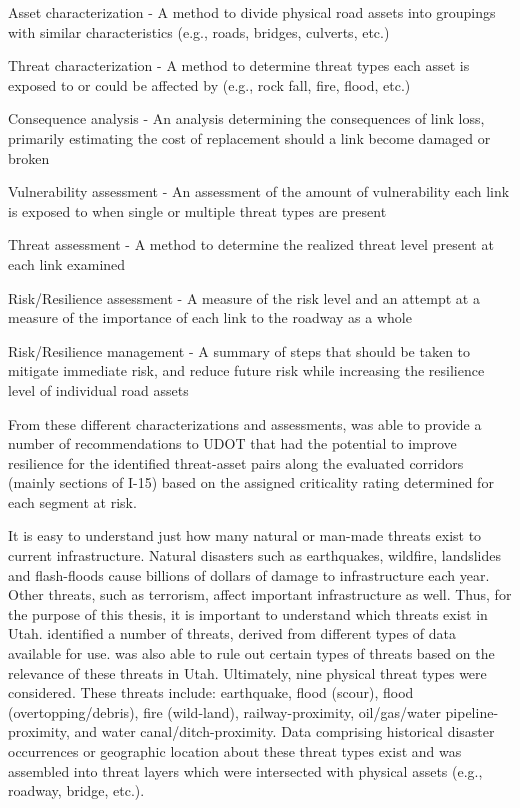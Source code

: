 \begin{description}
	\item Asset characterization - A method to divide physical road assets into
	groupings with similar characteristics (e.g., roads, bridges, culverts, etc.)
	\item Threat characterization - A method to determine threat types each asset
	is exposed to or could be affected by (e.g., rock fall, fire, flood, etc.)
	\item Consequence analysis - An analysis determining the consequences of link
	loss, primarily estimating the cost of replacement should a link become
	damaged or broken
	\item Vulnerability assessment - An assessment of the amount of vulnerability
	each link is exposed to when single or multiple threat types are present
	\item Threat assessment - A method to determine the realized threat level
	present at each link examined
	\item Risk/Resilience assessment - A measure of the risk level and an attempt
	at a measure of the importance of each link to the roadway as a whole
	\item Risk/Resilience management - A summary of steps that should be taken to
	mitigate immediate risk, and reduce future risk while increasing the
	resilience level of individual road assets
\end{description}

From these different characterizations and assessments,
\citet{aem2017} was able to provide a number of recommendations to UDOT that had the
potential to improve
resilience for the identified threat-asset pairs along the evaluated corridors (mainly sections of I-15)
based on the assigned criticality rating determined for each segment at risk.

It is easy to understand just how many natural or man-made threats exist to
current infrastructure. Natural disasters such as earthquakes, wildfire,
landslides and flash-floods cause billions of dollars of damage to infrastructure each year.
Other threats, such as terrorism, affect important infrastructure as well.
Thus, for the purpose of this thesis, it is important to understand which
threats exist in Utah. \citet{aem2017} identified a number of threats, derived
from different types of data available for use. \citet{aem2017} was
also able to rule out certain types of threats based on the relevance of these
threats in Utah. Ultimately, nine physical threat types were considered. These threats
include: earthquake, flood (scour), flood
(overtopping/debris), fire
(wild-land), railway-proximity, oil/gas/water pipeline-proximity, and water
canal/ditch-proximity. Data comprising historical disaster occurrences or
geographic location about these threat types exist and was assembled into
threat layers which were intersected with physical assets (e.g., roadway,
bridge, etc.).

